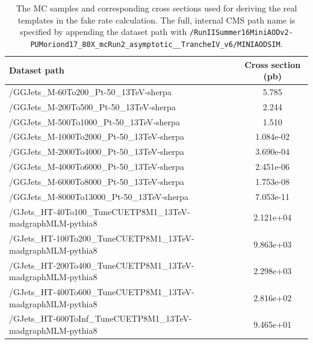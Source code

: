 \begin{table}[!htbp]
  \caption{The MC samples and corresponding cross sections used for deriving the real templates in the fake rate calculation. The full, internal CMS path name is specified by appending the dataset path with \texttt{/RunIISummer16MiniAODv2-\allowbreak PUMoriond17\_\allowbreak 80X\_\allowbreak mcRun2\_\allowbreak asymptotic\_\_\allowbreak TrancheIV\_\allowbreak v6/\allowbreak MINIAODSIM}.}
  \label{tab:real_template_samples}
  \centering
  \vspace{\baselineskip}
  \small
  \begin{tabular}{lc}
  \hline
  \hline
  Dataset path & Cross section (pb) \\ 
  \hline
  /GGJets\_M-60To200\_Pt-50\_13TeV-sherpa & 5.785 \\
  /GGJets\_M-200To500\_Pt-50\_13TeV-sherpa & 2.244 \\
  /GGJets\_M-500To1000\_Pt-50\_13TeV-sherpa & 1.510 \\
  /GGJets\_M-1000To2000\_Pt-50\_13TeV-sherpa & 1.084e-02 \\
  /GGJets\_M-2000To4000\_Pt-50\_13TeV-sherpa & 3.690e-04 \\
  /GGJets\_M-4000To6000\_Pt-50\_13TeV-sherpa & 2.451e-06 \\
  /GGJets\_M-6000To8000\_Pt-50\_13TeV-sherpa & 1.753e-08 \\
  /GGJets\_M-8000To13000\_Pt-50\_13TeV-sherpa & 7.053e-11 \\
  \hline
  /GJets\_HT-40To100\_TuneCUETP8M1\_13TeV-madgraphMLM-pythia8 & 2.121e+04 \\
  /GJets\_HT-100To200\_TuneCUETP8M1\_13TeV-madgraphMLM-pythia8 & 9.863e+03 \\
  /GJets\_HT-200To400\_TuneCUETP8M1\_13TeV-madgraphMLM-pythia8 & 2.298e+03 \\
  /GJets\_HT-400To600\_TuneCUETP8M1\_13TeV-madgraphMLM-pythia8 & 2.816e+02 \\ 
  /GJets\_HT-600ToInf\_TuneCUETP8M1\_13TeV-madgraphMLM-pythia8 & 9.465e+01 \\
  \hline \hline
  \end{tabular}
\end{table}

